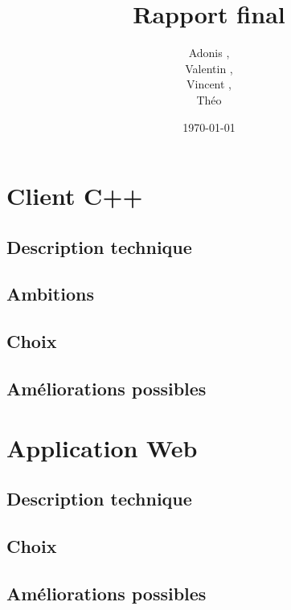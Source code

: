 \documentclass[a4paper]{article}
\title{Rapport final}
\author{Adonis \bsc{Najimi},\\
 Valentin \bsc{Stern},\\
 Vincent \bsc{Albert},\\
 Théo \bsc{Gerriet}}
\date{\today}
\begin{document}
\maketitle
\newpage

\section{Client C++}
    \subsection{Description technique}
    

    \subsection{Ambitions}
    

    \subsection{Choix}
    
    
    \subsection{Améliorations possibles}
    

\newpage
\section{Application Web}
	\subsection{Description technique}
	
	\subsection{Choix}
	
	\subsection{Améliorations possibles}
	
\newpage
\tableofcontents
\end{document}
